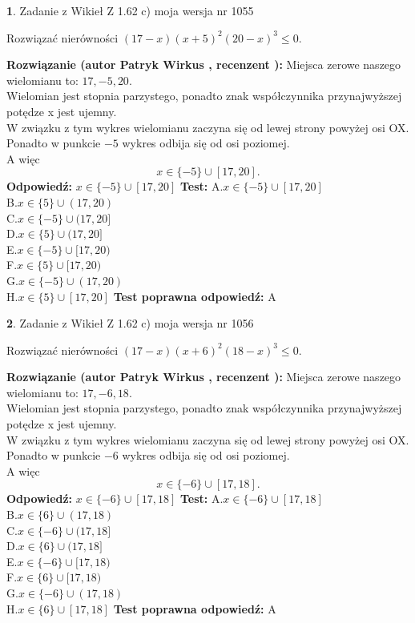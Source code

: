 \documentclass[12pt, a4paper]{article}
\theoremstyle{definition} %
\newtheorem{zad}{}
\newcommand{\zadStart}[1]{\begin{zad}#1\newline}
\newcommand{\zadStop}{\end{zad}}
\newcommand{\rozwStart}[2]{\noindent \textbf{Rozwiązanie (autor #1 , recenzent #2): }\newline}
\newcommand{\rozwStop}{\newline}
\newcommand{\odpStart}{\noindent \textbf{Odpowiedź:}\newline}
\newcommand{\odpStop}{\newline}
\newcommand{\testStart}{\noindent \textbf{Test:}\newline}
\newcommand{\testStop}{\newline}
\newcommand{\kluczStart}{\noindent \textbf{Test poprawna odpowiedź:}\newline}
\newcommand{\kluczStop}{\newline}
\begin{document}
\zadStart{Zadanie z Wikieł Z 1.62 c) moja wersja nr 1055}

Rozwiązać nierówności $(17-x)(x+5)^{2}(20-x)^{3}\le0$.
\zadStop
\rozwStart{Patryk Wirkus}{}
Miejsca zerowe naszego wielomianu to: $17, -5, 20$.\\
Wielomian jest stopnia parzystego, ponadto znak współczynnika przy\linebreak najwyższej potędze x jest ujemny.\\ W związku z tym wykres wielomianu zaczyna się od lewej strony powyżej osi OX.\\
Ponadto w punkcie $-5$ wykres odbija się od osi poziomej.\\
A więc $$x \in \{-5\} \cup [17,20].$$
\rozwStop
\odpStart
$x \in \{-5\} \cup [17,20]$
\odpStop
\testStart
A.$x \in \{-5\} \cup [17,20]$\\
B.$x \in \{5\} \cup (17,20)$\\
C.$x \in \{-5\} \cup (17,20]$\\
D.$x \in \{5\} \cup (17,20]$\\
E.$x \in \{-5\} \cup [17,20)$\\
F.$x \in \{5\} \cup [17,20)$\\
G.$x \in \{-5\} \cup (17,20)$\\
H.$x \in \{5\} \cup [17,20]$
\testStop
\kluczStart
A
\kluczStop



\zadStart{Zadanie z Wikieł Z 1.62 c) moja wersja nr 1056}

Rozwiązać nierówności $(17-x)(x+6)^{2}(18-x)^{3}\le0$.
\zadStop
\rozwStart{Patryk Wirkus}{}
Miejsca zerowe naszego wielomianu to: $17, -6, 18$.\\
Wielomian jest stopnia parzystego, ponadto znak współczynnika przy\linebreak najwyższej potędze x jest ujemny.\\ W związku z tym wykres wielomianu zaczyna się od lewej strony powyżej osi OX.\\
Ponadto w punkcie $-6$ wykres odbija się od osi poziomej.\\
A więc $$x \in \{-6\} \cup [17,18].$$
\rozwStop
\odpStart
$x \in \{-6\} \cup [17,18]$
\odpStop
\testStart
A.$x \in \{-6\} \cup [17,18]$\\
B.$x \in \{6\} \cup (17,18)$\\
C.$x \in \{-6\} \cup (17,18]$\\
D.$x \in \{6\} \cup (17,18]$\\
E.$x \in \{-6\} \cup [17,18)$\\
F.$x \in \{6\} \cup [17,18)$\\
G.$x \in \{-6\} \cup (17,18)$\\
H.$x \in \{6\} \cup [17,18]$
\testStop
\kluczStart
A
\kluczStop
\end{document}
